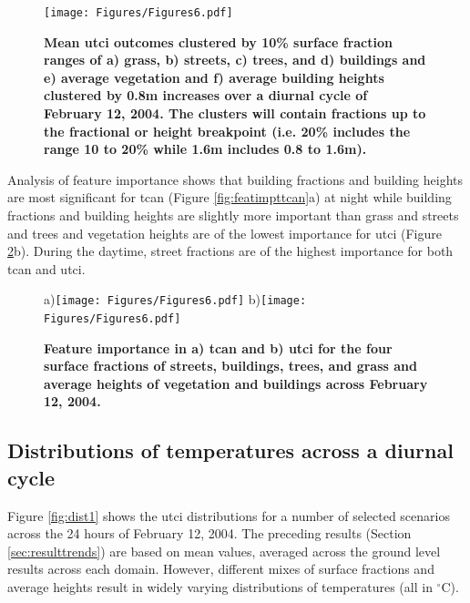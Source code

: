 \documentclass[final,3p,times,authoryear]{elsarticle}
\begin{document}
\begin{figure}
\centering
\texttt{[image: Figures/Figures6.pdf]}
\caption{\bf Mean \gls{utci} outcomes clustered by 10\% surface fraction ranges of a) grass, b) streets, c) trees, and d) buildings and e) average vegetation and f) average building heights clustered by 0.8m increases over a diurnal cycle of February 12, 2004. The clusters will contain fractions up to the fractional or height breakpoint (i.e. 20\% includes the range 10 to 20\%  while 1.6m includes 0.8 to 1.6m).}
 \label{fig:utciday}
\end{figure}


Analysis of feature importance shows that building fractions and building heights are most significant for \gls{tcan} (Figure \ref{fig:featimpttcan}a) at night while building fractions and building heights are slightly more important than grass and streets and trees and vegetation heights are of the lowest importance for \gls{utci} (Figure  \ref{fig:featimptutci}b). During the daytime, street fractions are of the highest importance for both \gls{tcan} and \gls{utci}.


\begin{figure}
\centering
{\tiny a)}\texttt{[image: Figures/Figures6.pdf]}
{\tiny b)}\texttt{[image: Figures/Figures6.pdf]}\\
\caption{\bf Feature importance in a) \gls{tcan} and b) \gls{utci} for the four surface fractions of streets, buildings, trees, and grass and average heights of vegetation and buildings across February 12, 2004.}
\label{fig:featimpttcan}
\label{fig:featimptutci}
\end{figure}




\subsection{Distributions of temperatures across a diurnal cycle}\label{sec:resultsdist}


Figure \ref{fig:dist1} shows the \gls{utci} distributions for a number of selected scenarios across the 24 hours of February 12, 2004. The preceding results (Section \ref{sec:resulttrends}) are based on mean values, averaged across the ground level results across each domain. However, different mixes of surface fractions and average heights result in widely varying distributions of temperatures (all in $^{\circ}$C). 
\end{document}
